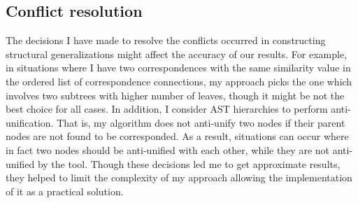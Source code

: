 \subsection{Conflict resolution}  \label{conflicts}
The decisions I have made to resolve the conflicts occurred in constructing structural generalizations might affect the accuracy of our results.
For example, in situations where I have two correspondences with the same similarity value in the ordered list of correspondence connections, my approach picks the one which involves two subtrees with higher number of leaves, though it might be not the best choice for all cases.
In addition, I consider AST hierarchies to perform anti-unification. That is, my algorithm does not anti-unify two nodes if their parent nodes are not found to be corresponded. As a result, situations can occur where in fact two nodes should be anti-unified with each other, while they are not anti-unified by the tool. Though these decisions led me to get approximate results, they helped to limit the complexity of my approach allowing the implementation of it as a practical solution.



